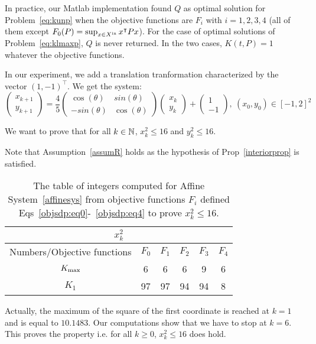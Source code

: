 \documentclass[10pt]{article}
\begin{document}
In practice, our Matlab implementation found $Q$ as optimal solution for Problem~\eqref{eq:kunp} when the objective functions are $F_i$ with $i=1,2,3,4$ (all of them except $F_0(P)=\sup_{x\in X^\mathrm{in}} x^\intercal P x$). For the case of optimal solutions of Problem~\eqref{eq:klmaxp}, $Q$ is never returned. In the two cases, $K(t,P)=1$ whatever the objective functions.
  
In our experiment, we add a translation tranformation characterized by the vector $(1,-1)^\intercal$. We get the system:
\begin{equation}
\label{affinesys}
\begin{pmatrix}
x_{k+1}\\
y_{k+1}
\end{pmatrix}
= \dfrac{4}{5}\begin{pmatrix}
 \cos(\theta)& sin(\theta)\\
-sin(\theta) & \cos(\theta)
\end{pmatrix}
\begin{pmatrix}
x_{k}\\
y_{k}
\end{pmatrix}+\begin{pmatrix}
1\\
-1
\end{pmatrix},\ (x_0,y_0)\in [-1,2]^2
\end{equation}

We want to prove that for all $k\in\mathbb{N}$, $x_k^2\leq 16$ and $y_k^2\leq 16$.

Note that Assumption~\ref{assumR} holds as the hypothesis of Prop~\ref{interiorprop} is satisfied.
\begin{table}[h!]
\begin{center}
\begin{tabular}{|c|c|c|c|c|c|}
\hline
\multicolumn{6}{|c|}{$x^2_k$}\\
\hline
Numbers/Objective functions & $F_0$ & $F_{1}$ & $F_{2}$ & $F_3$ & $F_4$ \\
\hline
$K_{\rm max}$ & 6&6 & 6&9&6 \\
\hline
 $K_{1}$ & 97& 97& 94&94 &8 \\
\hline
\end{tabular}
\end{center}
\caption{The table of integers computed for Affine System~\eqref{affinesys} from objective functions $F_i$ defined Eqs~\eqref{objsdp:eq0}-~\eqref{objsdp:eq4} to prove $x_k^2\leq 16$.}
\end{table}
Actually, the maximum of the square of the first coordinate is reached at $k=1$ and is equal to $10.1483$. Our computations show that we have to stop at $k=6$. This proves the property i.e. for all $k\geq 0$, $x_k^2\leq 16$ does hold. 
\end{document}
